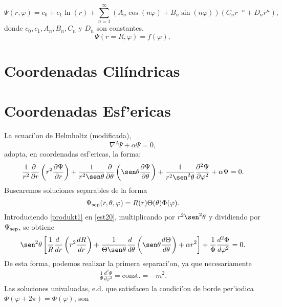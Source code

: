 \begin{equation}
\Psi(r,\varphi)=c_0+c_1\ln(r)+\sum_{n=1}^\infty\left(A_n\cos(n\varphi)+B_n\sin(n\varphi)\right)
\left(C_nr^{-n}+D_nr^n\right),
\end{equation}
donde $c_0,c_1,A_n,B_n,C_n$ y $D_n$ son constantes.
\begin{equation}
\Psi(r=R,\varphi)=f(\varphi),
\end{equation}


\section{Coordenadas Cil\'indricas}
\section{Coordenadas Esf'ericas}
La ecuaci'on de Helmholtz (modificada),
\begin{equation}
\nabla^2\Psi+\alpha\Psi=0,
\end{equation}
adopta, en coordenadas esf'ericas, la forma:
\begin{equation}
\frac{1}{r^2}\frac{\partial\ }{\partial r}\left(r^2\frac{\partial\Psi}{\partial r}\right)   
+\frac{1}{r^2\sen\theta}\frac{\partial}{\partial\theta}\left(\sen\theta\frac{
\partial\Psi}{\partial\theta}\right) + \frac{1}{r^2\sen^2  \theta}
\frac{\partial^2\Psi}{\partial \varphi^2}  +\alpha\Psi= 0.\label{est20}
 \end{equation}
Buscaremos soluciones separables de la forma 
 \begin{equation}\label{produkt1}
  \Psi_{\rm sep}(r,\theta,\varphi) = R(r)\Theta(\theta)\Phi(\varphi).
 \end{equation}
 Introduciendo \eqref{produkt1} en \eqref{est20}, multiplicando por $r^2\sen^2\theta$ y dividiendo por $\Psi_{\rm sep}$, se obtiene
\begin{equation}\label{Hsep}
\sen^2\theta\left[\frac{1}{R}\frac{d\ }{dr}\left(r^2\frac{dR}{dr}\right) +
\frac{1}{\Theta\sen\theta}\frac{d\ }{d\theta}\left(\sen\theta\frac{
d\Theta}{d\theta}\right) +\alpha r^2\right]+ \frac{1}{\Phi}\frac{d^2 \Phi}{d\varphi^2} = 0.
 \end{equation}
De esta forma, podemos realizar la primera separaci'on, ya que necesariamente
\begin{eqnarray}
\frac{1}{\Phi} \frac{d^2\Phi}{d\varphi^2} = \text{const.} = -m^2. \end{eqnarray}\label{loes1}
Las soluciones univaluadas, e.d. que satisfacen la condici'on de borde per'iodica $\Phi(\varphi+2\pi)=\Phi(\varphi)$, son
